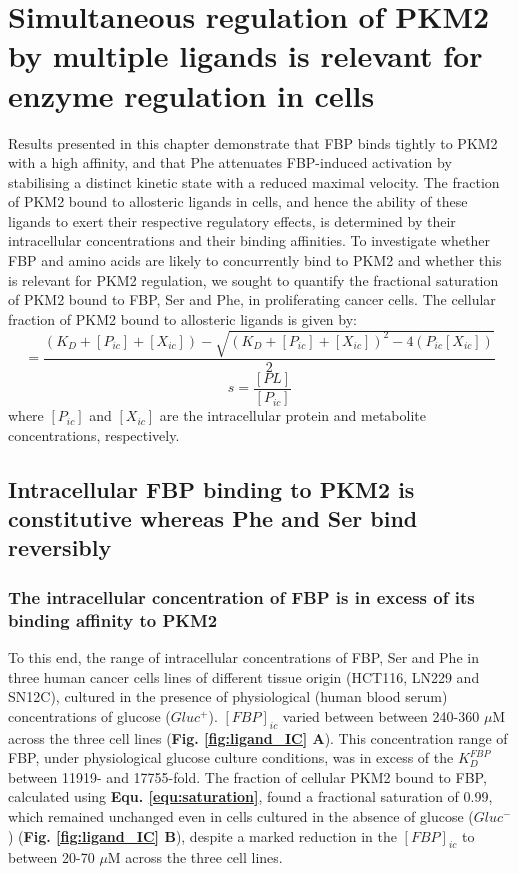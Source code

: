 \section{Simultaneous regulation of PKM2 by multiple ligands is relevant for enzyme regulation in cells} \label{Simultaneous regulation of PKM2 by multiple ligands is relevant for enzyme regulation in cells}
Results presented in this chapter demonstrate that FBP binds tightly to PKM2 with a high affinity, and that Phe attenuates FBP-induced activation by stabilising a distinct kinetic state with a reduced maximal velocity. The fraction of PKM2 bound to allosteric ligands in cells, and hence the ability of these ligands to exert their respective regulatory effects, is determined by their intracellular concentrations and their binding affinities. To investigate whether FBP and amino acids are likely to concurrently bind to PKM2 and whether this is relevant for PKM2 regulation, we sought to quantify the fractional saturation of PKM2 bound to FBP, Ser and Phe, in proliferating cancer cells. The cellular fraction of PKM2 bound to allosteric ligands is given by:
%
%
\begin{equation}
[PL] = \frac{(K_{D} + [P_{ic}] + [X_{ic}]) - \sqrt{(K_{D} + [P_{ic}] + [X_{ic}])^{2} - 4(P_{ic}[X_{ic}])}}{2}
\end{equation}
%
%
\begin{equation}
s = \frac{[PL]}{[P_{ic}]}
\label{equ:saturation}
\end{equation}
%
%
where $[P_{ic}]$ and $[X_{ic}]$ are the intracellular protein and metabolite concentrations, respectively. 

\subsection{Intracellular FBP binding to PKM2 is constitutive whereas Phe and Ser bind reversibly}
\label{subsec:ic_concentrations}

\subsubsection{The intracellular concentration of FBP is in excess of its binding affinity to PKM2}
To this end, the range of intracellular concentrations of FBP, Ser and Phe in three human cancer cells lines of different tissue origin (HCT116, LN229 and SN12C), cultured in the presence of physiological (human blood serum) concentrations of glucose ($Gluc^{+}$). $[FBP]_{ic}$ varied between between 240-360 $\mu$M across the three cell lines (\textbf{Fig. \ref{fig:ligand_IC} A}). This concentration range of FBP, under physiological glucose culture conditions, was in excess of the $K_{D}^{FBP}$ between 11919- and 17755-fold. The fraction of cellular PKM2 bound to FBP, calculated using \textbf{Equ. \ref{equ:saturation}}, found a fractional saturation of 0.99, which remained unchanged even in cells cultured in the absence of glucose ($Gluc^{-}$) (\textbf{Fig. \ref{fig:ligand_IC} B}), despite a marked reduction in the $[FBP]_{ic}$ to between 20-70 $\mu$M across the three cell lines.


